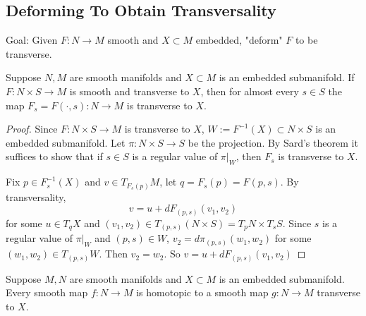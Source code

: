 \subsection*{Deforming To Obtain Transversality}
Goal: Given $F:N \to M$ smooth and $X \subset M$ embedded, "deform" $F$ to be transverse. 
\begin{theorem}\label{6.35}
    Suppose $N,M$ are smooth manifolds and $X \subset M$ is an embedded submanifold. If $F:N \times S \to M$ is smooth and transverse to $X$, then for almost every $s \in S$ the map $F_s = F(\cdot, s):N \to M$ is transverse to $X$. 
\end{theorem}
\begin{proof}
    Since $F:N \times S \to M$ is transverse to $X$, $W:=F^{-1}(X) \subset N \times S$ is an embedded submanifold. Let $\pi:N \times S \to S$ be the projection.
    By Sard's theorem it suffices to show that if $s \in S$ is a regular value of $\pi|_W$, then $F_s$  is transverse to $X$. 

    Fix $p \in F_s^{-1}(X)$ and $v \in T_{F_s(p)}M$, let $q = F_s(p) = F(p,s)$. By transversality, 
    $$v = u+dF_{(p,s)}(v_1, v_2)$$
    for some $u \in T_qX$ and $(v_1,v_2) \in T_{(p,s)}(N \times S) = T_pN \times T_sS$. Since $s$ is a regular value of $\pi|_W$ and $(p,s) \in W$, 
    $v_2 = d\pi_{(p,s)}(w_1,w_2)$ for some $(w_1, w_2) \in T_{(p,s)}W$. Then $v_2=w_2$. So $v=u+dF_{(p,s)}(v_1, v_2)$
\end{proof}
\begin{theorem}\label{6.36}
    Suppose $M,N$ are smooth manifolds and $X \subset M$ is an embedded submanifold. Every smooth map $f:N \to M$ is homotopic to a smooth map $g:N \to M$ transverse to $X$. 
\end{theorem}

